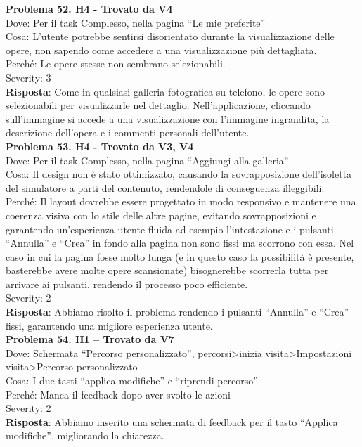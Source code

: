 \documentclass{article}
\begin{document}
\noindent \textbf{Problema 52. H4 - Trovato da V4} \\
Dove: Per il task Complesso, nella pagina “Le mie preferite” \\
Cosa: L'utente potrebbe sentirsi disorientato durante la visualizzazione delle opere, non sapendo come accedere a una visualizzazione più dettagliata. \\
Perché: Le opere stesse non sembrano selezionabili. \\
Severity: 3 \\
\textbf{Risposta}: Come in qualsiasi galleria fotografica su telefono, le opere sono selezionabili per visualizzarle nel dettaglio. Nell’applicazione, cliccando sull’immagine si accede a una visualizzazione con l’immagine ingrandita, la descrizione dell’opera e i commenti personali dell’utente.\\

\noindent \textbf{Problema 53. H4 - Trovato da V3, V4} \\
Dove: Per il task Complesso, nella pagina “Aggiungi alla galleria” \\
Cosa: Il design non è stato ottimizzato, causando la sovrapposizione dell'isoletta del simulatore a parti del contenuto, rendendole di conseguenza illeggibili. \\
Perché: Il layout dovrebbe essere progettato in modo responsivo e mantenere una coerenza visiva con lo stile delle altre pagine, evitando sovrapposizioni e garantendo un’esperienza utente fluida ad esempio l’intestazione e i pulsanti “Annulla” e “Crea” in fondo alla pagina non sono fissi ma scorrono con essa. Nel caso in cui la pagina fosse molto lunga (e in questo caso la possibilità è presente, basterebbe avere molte opere scansionate) bisognerebbe scorrerla tutta per arrivare ai pulsanti, rendendo il processo poco efficiente. \\
Severity: 2 \\
\textbf{Risposta}: Abbiamo risolto il problema rendendo i pulsanti “Annulla” e “Crea” fissi, garantendo una migliore esperienza utente.\\

\noindent \textbf{Problema 54. H1 – Trovato da V7} \\
Dove: Schermata “Percorso personalizzato”, percorsi>inizia visita>Impostazioni visita>Percorso personalizzato \\
Cosa: I due tasti “applica modifiche” e “riprendi percorso” \\
Perché: Manca il feedback dopo aver svolto le azioni \\
Severity: 2 \\
\textbf{Risposta}: Abbiamo inserito una schermata di feedback per il tasto “Applica modifiche”, migliorando la chiarezza.\\
\end{document}
